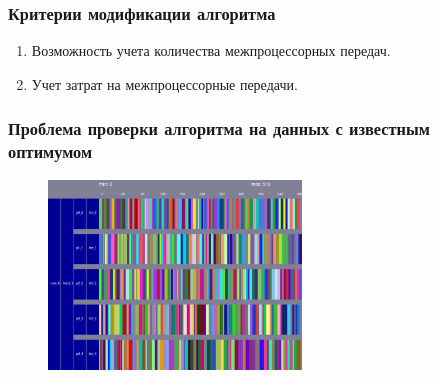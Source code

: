 \begin{frame}
    \frametitle{Критерии модификации алгоритма}
    \begin{enumerate}
        \item Возможность учета количества межпроцессорных передач.
        \item Учет затрат на межпроцессорные передачи.
    \end{enumerate}
\end{frame}


\begin{frame}
    \frametitle{Проблема проверки алгоритма на данных с известным оптимумом}
    \begin{figure}
        \includegraphics[width=0.6\textwidth]{imgs/balanced-schedule.jpg}
    \end{figure}
\end{frame}

